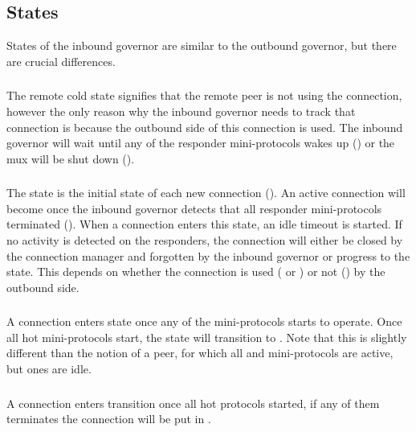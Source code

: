 \subsection{States}

States of the inbound governor are similar to the outbound governor, but there
are crucial differences.

\subsubsection{\RemoteCold}
The remote cold state signifies that the remote peer is not using the
connection, however the only reason why the inbound governor needs to track
that connection is because the outbound side of this connection is used.  The
inbound governor will wait until any of the responder mini-protocols wakes up
(\AwakeRemote{}) or the mux will be shut down (\MuxTerminated{}).

\subsubsection{\RemoteIdle}
The \RemoteIdle{} state is the initial state of each new connection
(\NewConnection{}).  An active connection will become \RemoteIdle{} once the
inbound governor detects that all responder mini-protocols terminated
(\WaitIdleRemote{}).  When a connection enters this state, an idle timeout is
started.  If no activity is detected on the responders, the connection will
either be closed by the connection manager and forgotten by the inbound
governor or progress to the \RemoteCold{} state.  This depends on whether the
connection is used (\warm{} or \hot{}) or not (\cold{}) by the outbound side.

\subsubsection{\RemoteWarm}
A connection enters \RemoteWarm{} state once any of the mini-protocols starts
to operate.  Once all hot mini-protocols start, the state will transition to
\RemoteHot{}.  Note that this is slightly different than the notion of a \warm{}
peer, for which all \established{} and \warm{} mini-protocols are active, but
\hot{} ones are idle.

\subsubsection{\RemoteHot}
A connection enters \RemoteHot{} transition once all hot protocols started, if
any of them terminates the connection will be put in \RemoteWarm{}.

